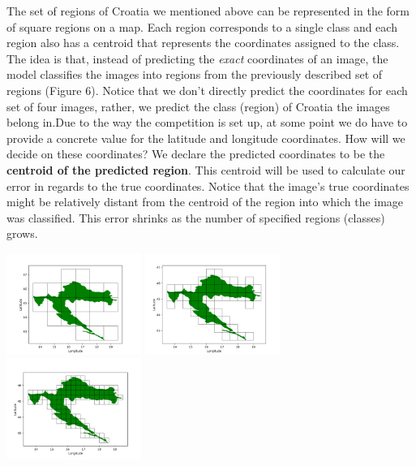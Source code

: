 \documentclass[]{article}
\begin{document}
The set of regions of Croatia we mentioned above can be represented in
the form of square regions on a map. Each region corresponds to a single
class and each region also has a centroid that represents the
coordinates assigned to the class. The idea is that, instead of
predicting the \emph{exact} coordinates of an image, the model
classifies the images into regions from the previously described set of
regions (Figure 6). Notice that we don't directly predict the
coordinates for each set of four images, rather, we predict the class
(region) of Croatia the images belong in.Due to the way the competition
is set up, at some point we do have to provide a concrete value for the
latitude and longitude coordinates. How will we decide on these
coordinates? We declare the predicted coordinates to be the
\textbf{centroid of the predicted region}. This centroid will be used to
calculate our error in regards to the true coordinates. Notice that the
image's true coordinates might be relatively distant from the centroid
of the region into which the image was classified. This error shrinks as
the number of specified regions (classes) grows.

\includegraphics[width=0.33\textwidth,height=\textheight]{./tex2pdf.-3ffa51a14b505aec/b61362e9c2de24f5ede1f3bc751fa3e902240ebc.png}
\includegraphics[width=0.33\textwidth,height=\textheight]{./tex2pdf.-3ffa51a14b505aec/6e62652a68942c14b1929fc905163abbcecb2431.png}
\includegraphics[width=0.33\textwidth,height=\textheight]{./tex2pdf.-3ffa51a14b505aec/52d8096b347910673f59b8817a76ed0d70cc9137.png}
\end{document}
